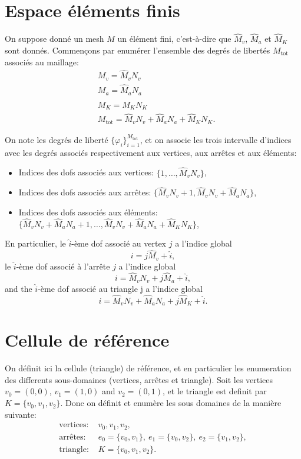 \section{Espace \'el\'ements finis}
On suppose donn\'e un mesh $M$ un \'el\'ement fini, c'est-\`a-dire que
$\hat M_v$, $\hat M_a$ et $\hat M_K$ sont donn\'es. Commen\c cons par
enum\'erer l'ensemble des degr\'es de libert\'es $M_\text{tot}$
associ\'es au maillage: 
\begin{align}
  & M_v = \hat M_v N_v\\
  & M_a = \hat M_a N_a\\
  & M_K = \hat M_K N_K\\
  & M_\text{tot} = \hat M_v N_v + \hat M_a N_a + \hat M_K N_K.
\end{align}

On note les degr\'es de libert\'e $\{\varphi_i\}_{i=1}^{M_\text{tot}}$,
et on associe les trois intervalle d'indices avec les degr\'es
associ\'es respectivement aux vertices, aux arr\^etes et aux
\'el\'ements: 

\begin{itemize}
\item Indices des dofs associ\'es aux vertices: $\{1, \dots, \hat M_v
  N_v\}$,
\item Indices des dofs associ\'es aux arr\^etes: $\{\hat M_v N_v + 1,
  \hat M_v N_v + \hat M_a N_a\}$,
\item Indices des dofs associ\'es aux \'el\'ements: $\{\hat M_v N_v + \hat
  M_a N_a + 1, \dots, \hat M_v N_v + \hat M_a N_a + \hat M_K N_K\}$,
\end{itemize}

En particulier, le $\hat i$-\`eme dof associ\'e au vertex $j$ a l'indice global 
\begin{equation}
  i = j \hat M_v + \hat i,
\end{equation}
le $\hat i$-\`eme dof associ\'e \`a l'arr\^ete $j$ a l'indice global 
\begin{equation}
  i = \hat M_v N_v + j \hat M_a + \hat i,
\end{equation}
and the $\hat i$-\`eme dof associ\'e au triangle j a l'indice global 
\begin{equation}
  i = \hat M_v N_v + \hat M_a N_a + j \hat M_K + \hat i.
\end{equation}

\section{Cellule de r\'ef\'erence}
On d\'efinit ici la cellule (triangle) de r\'ef\'erence, et en
particulier les enumeration des differents sous-domaines (vertices,
arr\^etes et triangle). Soit les vertices $v_0 = (0,0)$, $v_1 =
(1,0)$ and $v_2 = (0,1)$, et le triangle est definit par $K = \{v_0,
v_1, v_2\}$. Donc on d\'efinit et enum\`ere les sous domaines de la
mani\`ere suivante: 
\begin{align*}
  \text{vertices: } & v_0, v_1, v_2,\\
  \text{arr\^etes: } & e_0 = \{v_0, v_1\},\ e_1 = \{v_0, v_2\},\ e_2 =
  \{v_1, v_2\}, \\
  \text{triangle: } & K = \{v_0, v_1, v_2\}.
\end{align*}

